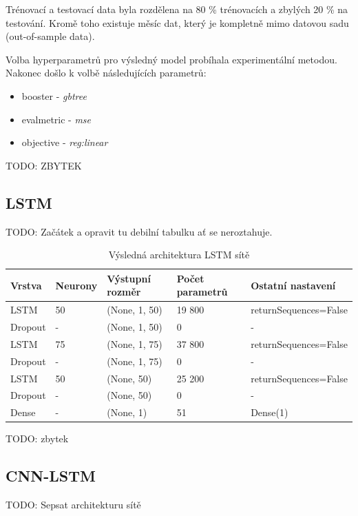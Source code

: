 \documentclass[FM,BP,fonts]{tulthesis}
\begin{document}
Trénovací a testovací data byla rozdělena na 80 \% trénovacích a zbylých 20 \% na testování. Kromě toho existuje měsíc dat, který je kompletně mimo datovou sadu (out-of-sample data). 

Volba hyperparametrů pro výsledný model probíhala experimentální metodou. Nakonec došlo k volbě následujících parametrů:
\begin{itemize}
	\item booster - \textit{gbtree}
	\item evalmetric - \textit{mse}
	\item objective - \textit{reg:linear}
\end{itemize} 

TODO: ZBYTEK

\subsection{LSTM}
TODO: Začátek a opravit tu debilní tabulku ať se neroztahuje.
\begin{table}[!ht]
	\centering
	\caption{Výsledná architektura LSTM sítě}
	
	\begin{tabular}{lllll}
		\hline
		\textbf{Vrstva} & \textbf{Neurony} & \textbf{Výstupní rozměr} & \textbf{Počet parametrů} & \textbf{Ostatní nastavení} \\ \hline
		
		LSTM & 50 & (None, 1, 50) & 19 800 & returnSequences=False \\
		Dropout & - & (None, 1, 50) & 0 & - \\
		LSTM  & 75 & (None, 1, 75) & 37 800 & returnSequences=False \\
		Dropout & - & (None, 1, 75) & 0 & - \\
		LSTM   & 50 & (None, 50) & 25 200 & returnSequences=False \\
		Dropout & - & (None, 50) & 0 & - \\
		Dense & - & (None, 1) & 51 & Dense(1) \\
		
		
	\end{tabular}
\end{table}

TODO: zbytek

\subsection{CNN-LSTM}

TODO: Sepsat architekturu sítě
\end{document}
